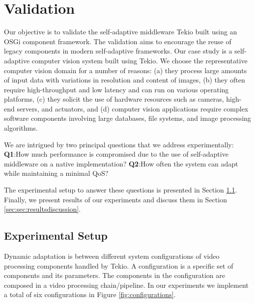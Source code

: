 \documentclass{acm_proc_article-sp}
\begin{document}
\section{Validation}
\label{sec:validation}

Our objective is to validate the self-adaptive middleware Tekio built using an OSGi component framework. The validation aims to encourage the reuse of legacy components in modern self-adaptive frameworks. Our case study is a self-adaptive computer vision system built using Tekio. We choose the representative computer vision domain for a number of reasons: (a) they process large amounts of input data with variations in resolution and content of images, (b) they often require high-throughput and low latency and can run on various operating platforms, (c) they solicit the use of hardware resources such as cameras, high-end  servers, and actuators, and (d) computer vision applications require complex software components involving large databases, file systems, and image processing algorithms.

We are intrigued by two principal questions that we address experimentally:
\noindent \textbf{Q1}:How much performance is compromised due to the use of self-adaptive middleware on a native implementation?
\noindent \textbf{Q2}:How often the system can adapt while maintaining a minimal QoS?

The experimental setup to answer these questions is presented in Section \ref{sec:sec:experimentalsetup}. Finally, we present results of our experiments and discuss them in Section \ref{sec:sec:resultsdiscussion}.


\subsection{Experimental Setup}
\label{sec:sec:experimentalsetup}

Dynamic adaptation is between different system configurations of video processing components handled by Tekio. A configuration is a specific set of components and its parameters. The components in the configuration are composed in a video processing chain/pipeline. In our experiments we implement a total of six configurations in Figure \ref{fig:configurations}.
\end{document}

